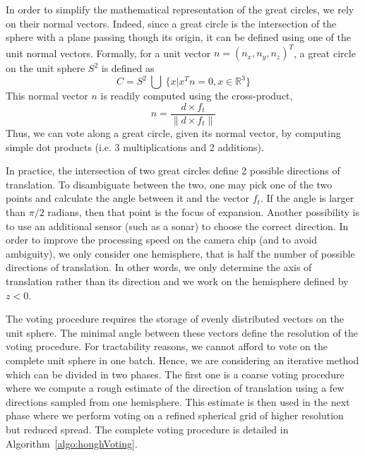 In order to simplify the mathematical representation of the great circles, we rely on their normal vectors. Indeed, since a great circle is the intersection of the sphere with a plane passing though its origin, it can be defined using one of the unit normal vectors.
Formally, for a unit vector $n = (n_x, n_y, n_z)^T$, a great circle on the unit sphere $S^2$ is defined as
\begin{equation}
C = S^2~\bigcup~\{ x|x^Tn = 0, x \in \mathbb{R}^3 \}
\end{equation}
This normal vector $n$ is readily computed using the cross-product,
\begin{equation}
n = \dfrac{d \times f_t}{\|d \times f_t\|}
\end{equation}
Thus, we can vote along a great circle, given its normal vector, by computing simple dot products (i.e. 3 multiplications and 2 additions).

In practice, the intersection of two great circles define 2 possible directions of translation. To disambiguate between the two, one may pick one of the two points and calculate the angle between it and the vector $f_t$. If the angle is larger than $\pi/2$ radians, then that point is the focus of expansion. Another possibility is to use an additional sensor (such as a sonar) to choose the correct direction. In order to improve the processing speed on the camera chip (and to avoid ambiguity), we only consider one hemisphere, that is half the number of possible directions of translation. In other words, we only determine the axis of translation rather than its direction and we work on the hemisphere defined by $z<0$.

The voting procedure requires the storage of evenly distributed vectors on the unit sphere. The minimal angle between these vectors define the resolution of the voting procedure. For tractability reasons, we cannot afford to vote on the complete unit sphere in one batch. Hence, we are considering an iterative method which can be divided in two phases. The first one is a coarse voting procedure where we compute a rough estimate of the direction of translation using a few directions sampled from one hemisphere. This estimate is then used in the next phase where we perform voting on a refined spherical grid of higher resolution but reduced spread. The complete voting procedure is detailed in Algorithm~\ref{algo:houghVoting}.

